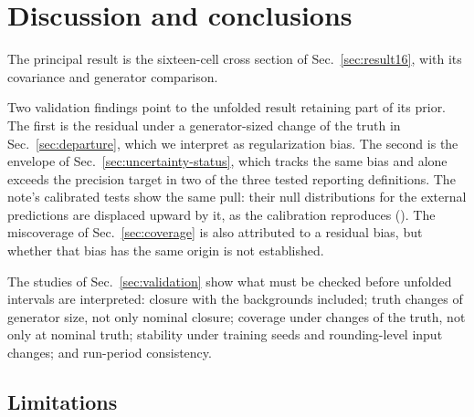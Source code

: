 \section{Discussion and conclusions}
\label{sec:conclusions}

The principal result is the sixteen-cell cross section of Sec.~\ref{sec:result16}, with its covariance and generator
comparison.

\label{sec:limits}
Two validation findings point to the unfolded result retaining part of its prior.
The first is the residual under a generator-sized change of the truth in Sec.~\ref{sec:departure}, which we
interpret as regularization bias.
The second is the envelope of Sec.~\ref{sec:uncertainty-status}, which tracks the same bias and alone exceeds the
precision target in two of the three tested reporting definitions.
The note's calibrated tests show the same pull: their null distributions for the external predictions are displaced
upward by it, as the calibration reproduces ().
The miscoverage of Sec.~\ref{sec:coverage} is also attributed to a residual bias, but whether that bias has the same
origin is not established.

The studies of Sec.~\ref{sec:validation} show what must be checked before unfolded intervals are interpreted:
closure with the backgrounds included; truth changes of generator size, not only nominal closure; coverage under
changes of the truth, not only at nominal truth; stability under training seeds and rounding-level input changes;
and run-period consistency.

\subsection{Limitations}
\label{sec:limitations}

